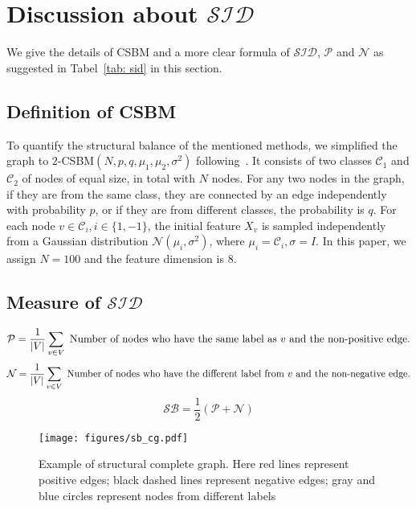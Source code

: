 \section{Discussion about $\mathcal{SID}$}
\label{app: SID-csbm}

We give the details of CSBM and a more clear formula of $\mathcal{SID}$, $\mathcal{P}$ and $\mathcal{N}$ as suggested in Tabel~\ref{tab: sid} in this section.

\subsection{Definition of CSBM}
\label{app: csbm}
To quantify the structural balance of the mentioned methods, we simplified the graph to $2$-CSBM$(N, p, q, \mu_1, \mu_2, \sigma^2 )$ following~\cite{sbm_xinyi}. 
It consists of two classes $\mathcal{C}_1$ and $\mathcal{C}_2$ of nodes of equal size, in total with $N$ nodes. 
For any two nodes in the graph, if they are from the same class, they are connected by an edge independently with probability $p$, or if they are from different classes, the probability is $q$. For each node $v \in \mathcal{C}_i, i\in\{1,-1\}$, the initial feature $X_v$ is sampled independently from a Gaussian distribution $\mathcal{N}(\mu_i, {\sigma^2})$, where $\mu_i =\mathcal{C}_i, \sigma = I $. 
In this paper, we assign $N=100$ and the feature dimension is $8$.

\subsection{Measure of $\mathcal{SID}$}
\begin{equation}
    \mathcal{P}
=
\frac{1}{|V|} \sum_{v \in V} \hbox{ Number of nodes who have the same label as}~v~\hbox{and the non-positive edge}.
\end{equation}
\begin{equation}
    \mathcal{N}=\frac{1}{|V|} \sum_{v \in V}\hbox{ Number of nodes who have the different label from}~v~\hbox{and the non-negative edge}.
\end{equation}
\begin{equation}
    \mathcal{SB} = \frac{1}{2}(\mathcal{P} + \mathcal{N})
\end{equation}
\begin{figure}
    \centering
    \texttt{[image: figures/sb\_cg.pdf]}
    \caption{Example of structural complete graph. Here red lines represent positive edges; black dashed lines represent negative edges; gray and blue circles represent nodes from different labels}
    \label{fig:sb_cg}
\end{figure}

